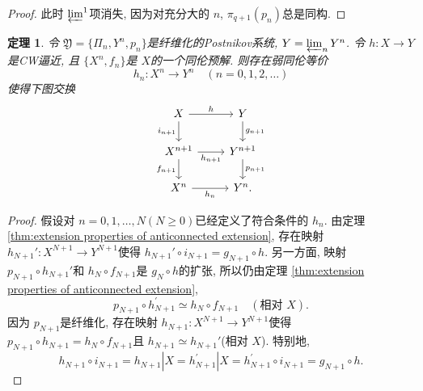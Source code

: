 \documentclass{ctexart}
\theoremstyle{plain}
\newtheorem{theorem}{定理}[section]
\theoremstyle{definition}
\begin{document}
        \begin{proof}
            此时 ${\varprojlim}^{1}$项消失, 因为对充分大的 $n$, $\pi_{q+1}(p_{n})$总是同构.
        \end{proof}

        \begin{theorem}
            令 $\mathfrak{Y}=\{\Pi_{n}, Y^{n}, p_{n}\}$是纤维化的Postnikov系统, $Y=\varprojlim_{n}Y^{n}$. 令 $h:X\to Y$是CW逼近, 且 $\{X^{n},f_{n}\}$是 $X$的一个同伦预解. 则存在弱同伦等价
            \begin{equation*}
                h_n:X^n\to Y^n\quad(n=0, 1, 2,\ldots)
            \end{equation*}
            使得下图交换
            \begin{equation*}
              \begin{tikzcd}
                X\arrow[r, "h"] \arrow[d, "i_{n+1}"'] & Y \arrow[d, "g_{n+1}"] \\
                X^{n+1} \arrow[r, "h_{n+1}"'] \arrow[d, "f_{n+1}"'] & Y^{n+1} \arrow[d, "p_{n+1}"] \\
                X^{n} \arrow[r, "h_{n}"'] & Y^{n}.
              \end{tikzcd}
            \end{equation*}
        \end{theorem}

        \begin{proof}
            假设对 $n=0,1, \ldots ,N(N\ge 0)$已经定义了符合条件的 $h_{n}$. 由定理 \ref{thm:extension properties of anticonnected extension}, 存在映射 $h_{N+1}':X^{N+1}\to Y^{N+1}$使得 $h_{N+1}'\circ i_{N+1}=g_{N+1}\circ h$. 另一方面, 映射 $p_{N+1}\circ h_{N+1}'$和 $h_{N}\circ f_{N+1}$是 $g_{N}\circ h$的扩张, 所以仍由定理 \ref{thm:extension properties of anticonnected extension}, 
            \begin{equation*}
                p_{N+1}\circ h_{N+1}^{\prime}\simeq h_{N}\circ f_{N+1}\quad(\text{相对 }X).
            \end{equation*}
            因为 $p_{N+1}$是纤维化, 存在映射 $h_{N+1}:X^{N+1}\to Y^{N+1}$使得 $p_{N+1}\circ h_{N+1}=h_{N}\circ f_{N+1}$且 $h_{N+1}\simeq h_{N+1}'$(相对 $X$). 特别地, 
            \begin{equation*}
                h_{N+1}\circ i_{N+1}=h_{N+1}|X=h_{N+1}^{\prime}|X=h_{N+1}^{\prime}\circ i_{N+1}=g_{N+1}\circ h.
            \end{equation*}
        \end{proof}
\end{document}
